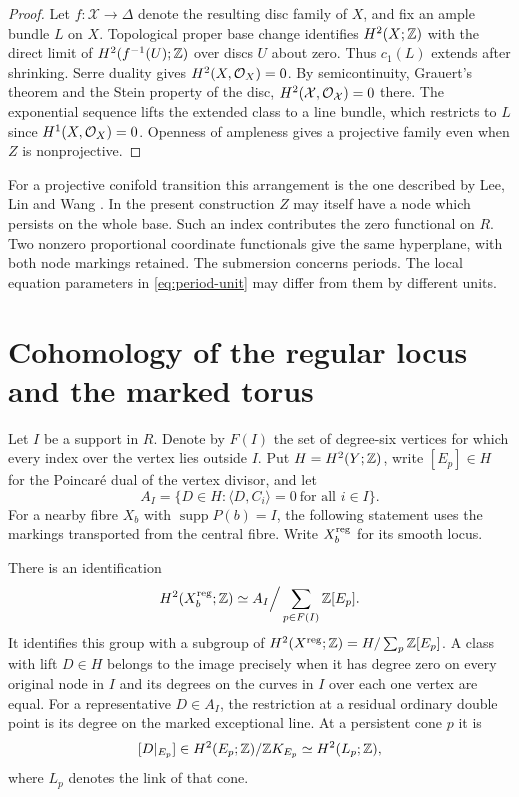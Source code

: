 \begin{proof}
Let $f\colon\mathcal X\to\Delta$ denote the resulting disc family
of $X$, and fix an ample bundle $L$ on $X$. Topological proper base
change identifies $H^2(X;\mathbb Z)$ with the direct limit of
$H^2(f^{-1}(U);\mathbb Z)$ over discs $U$ about zero. Thus $c_1(L)$
extends after shrinking. Serre duality gives $H^2(X,\mathcal O_X)=0$.
By semicontinuity, Grauert's theorem and the Stein property of the
disc, $H^2(\mathcal X,\mathcal O_{\mathcal X})=0$ there. The exponential
sequence lifts the extended class to a line bundle, which restricts
to $L$ since $H^1(X,\mathcal O_X)=0$. Openness of ampleness gives a
projective family even when $Z$ is nonprojective.
\end{proof}

For a projective conifold transition this arrangement is the one
described by Lee, Lin and Wang \cite[Lemma~3.13 and
Proposition~3.16]{LLW}. In the present construction $Z$ may itself
have a node which persists on the whole base. Such an index contributes
the zero functional on $R$. Two nonzero proportional coordinate
functionals give the same hyperplane, with both node markings retained.
The submersion concerns periods. The local equation parameters in
\eqref{eq:period-unit} may differ from them by different units.

\section{Cohomology of the regular locus and the marked torus}
\label{sec:marked-generators}

Let $I$ be a support in $R$. Denote by $F(I)$ the set of degree-six
vertices for which every index over the vertex lies outside $I$.
Put $H=H^2(Y;\mathbb Z)$, write $[E_p]\in H$ for the Poincar\'e dual
of the vertex divisor, and let
\[
 A_I=\{D\in H:\langle D,C_i\rangle=0\ \text{for all }i\in I\}.
\]
For a nearby fibre $X_b$ with $\operatorname{supp}P(b)=I$, the
following statement uses the markings transported from the central
fibre. Write $X_b^{\rm reg}$ for its smooth locus.

\begin{proposition}\label{prop:marked-generators}
There is an identification
\[
 H^2(X_b^{\rm reg};\mathbb Z)
       \simeq A_I\Big/\sum_{p\in F(I)}\mathbb Z[E_p].
\]
It identifies this group with a subgroup of
$H^2(X^{\rm reg};\mathbb Z)=H/\sum_p\mathbb Z[E_p]$. A class with lift $D\in H$
belongs to the image precisely when it has degree zero on every
original node in $I$ and its degrees on the curves in $I$ over each
one vertex are equal. For a representative $D\in A_I$, the restriction
at a residual ordinary double point is its degree on the marked
exceptional line. At a persistent cone $p$ it is
\[
 [D|_{E_p}]\in H^2(E_p;\mathbb Z)/\mathbb Z K_{E_p}\simeq H^2(L_p;\mathbb Z),
\]
where $L_p$ denotes the link of that cone.
\end{proposition}

